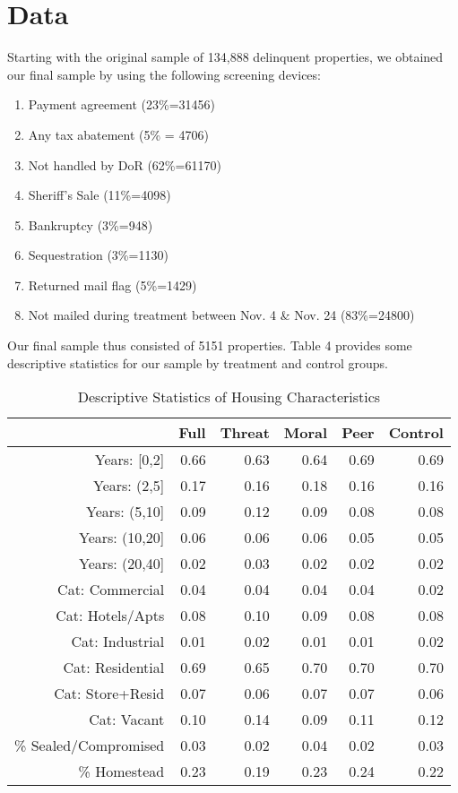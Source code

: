 \documentclass[12pt,titlepage]{article}
\begin{document}
\section{Data}

Starting with the original sample of 134,888 delinquent properties, we
obtained our final sample by using the following screening devices:
\begin{enumerate}
\item Payment agreement (23\%=31456)
\item Any tax abatement (5\% = 4706)
\item Not handled by DoR (62\%=61170)
\item Sheriff's Sale (11\%=4098)
\item Bankruptcy (3\%=948)
\item Sequestration (3\%=1130)
\item Returned mail flag (5\%=1429)
\item Not mailed during treatment between Nov. 4 \& Nov. 24 (83\%=24800)
\end{enumerate}
Our final sample thus consisted of 5151 properties. Table 4 provides
some descriptive statistics for our sample by treatment and control
groups.


\begin{table}[htbp] 
\caption{Descriptive Statistics of Housing Characteristics}
\centering 
\begin{tabular}{rrrrrr}
\hline
                 & Full & Threat & Moral & Peer & Control \\
\hline
Years: [0,2]          & 0.66 & 0.63 & 0.64 & 0.69 & 0.69 \\
Years: (2,5]          & 0.17 & 0.16 & 0.18 & 0.16 & 0.16 \\
Years: (5,10]         & 0.09 & 0.12 & 0.09 & 0.08 & 0.08 \\
Years: (10,20]        & 0.06 & 0.06 & 0.06 & 0.05 & 0.05 \\ 
Years: (20,40]        & 0.02 & 0.03 & 0.02 & 0.02 & 0.02 \\   
Cat: Commercial       & 0.04 & 0.04 & 0.04 & 0.04 & 0.02 \\    
Cat: Hotels/Apts      & 0.08 & 0.10 & 0.09 & 0.08 & 0.08 \\   
Cat: Industrial       & 0.01 & 0.02 & 0.01 & 0.01 & 0.02 \\    
Cat: Residential      & 0.69 & 0.65 & 0.70 & 0.70 & 0.70 \\   
Cat: Store+Resid      & 0.07 & 0.06 & 0.07 & 0.07 & 0.06 \\    
Cat: Vacant           & 0.10 & 0.14 & 0.09 & 0.11 & 0.12 \\    
\% Sealed/Compromised & 0.03 & 0.02 & 0.04 & 0.02 & 0.03 \\    
\% Homestead          & 0.23 & 0.19 & 0.23 & 0.24 & 0.22 \\     
\hline 
\end{tabular} 
\end{table}
\end{document}
